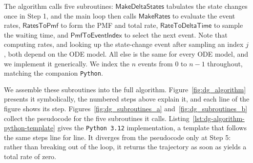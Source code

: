 The algorithm calls five subroutines: $\textsf{MakeDeltaStates}$ tabulates the state changes once in Step 1, and the main loop then calls $\textsf{MakeRates}$ to evaluate the event rates, $\textsf{RatesToPmf}$ to form the PMF and total rate, $\textsf{RateToDeltaTime}$ to sample the waiting time, and $\textsf{PmfToEventIndex}$ to select the next event.
Note that computing rates, and looking up the state-change event after sampling an index $j$, both depend on the ODE model.
All else is the same for every ODE model, and we implement it generically. We index the $n$ events from $0$ to $n-1$ throughout, matching the companion \texttt{Python}.

We assemble these subroutines into the full algorithm. Figure~\ref{fig:dg_algorithm} presents it symbolically, the numbered steps above explain it, and each line of the figure shows its step. Figures~\ref{fig:dg_subroutines_a} and~\ref{fig:dg_subroutines_b} collect the pseudocode for the five subroutines it calls. Listing~\ref{lst:dg-algorithm-python-template} gives the \texttt{Python 3.12} implementation, a template that follows the same steps line for line. It diverges from the pseudocode only at Step 5: rather than breaking out of the loop, it returns the trajectory as soon as \RatesToPmf{} yields a total rate of zero.

